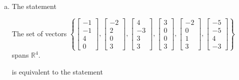 \begin{exerciseAnswer}
\begin{enumerate}[(a)]
\item The statement 
\begin{center}\begin{minipage}{0.8\textwidth}
 The set of vectors \( \left\{ \left[\begin{array}{c}
-1 \\
-1 \\
4 \\
0
\end{array}\right] , \left[\begin{array}{c}
-2 \\
2 \\
0 \\
3
\end{array}\right] , \left[\begin{array}{c}
4 \\
-3 \\
3 \\
3
\end{array}\right] , \left[\begin{array}{c}
3 \\
0 \\
0 \\
3
\end{array}\right] , \left[\begin{array}{c}
-2 \\
0 \\
1 \\
3
\end{array}\right] , \left[\begin{array}{c}
-5 \\
-5 \\
4 \\
-3
\end{array}\right] \right\} \) spans \(\mathbb{R}^4\). 
\end{minipage}\end{center}
     is equivalent to the statement 
\begin{center}\begin{minipage}{0.8\textwidth}
 The vector equation \( x_{1} \left[\begin{array}{c}
-1 \\
-1 \\
4 \\
0
\end{array}\right] + x_{2} \left[\begin{array}{c}
-2 \\
2 \\

\end{array}
\end{minipage}
\end{center}
\end{enumerate}
\end{exerciseAnswer}
